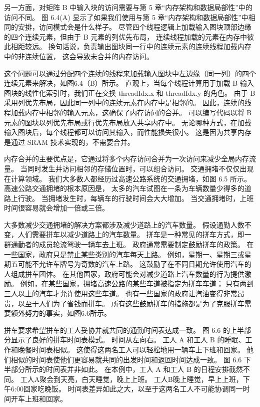 另一方面，对矩阵 B 中输入块的访问需要与第 5 章“内存架构和数据局部性”中的访问不同。 
图 6.4(A) 显示了如果我们使用与第 5 章“内存架构和数据局部性”中相同的安排，访问模式会是什么样子。 
尽管四个线程逻辑上加载输入图块顶部边缘的四个连续元素，但由于 B 元素的列优先布局，
连续线程加载的元素在内存中彼此相距较远。 换句话说，负责输出图块同一行中的连续元素的连续线程加载内存中的非连续位置，
这会导致未合并的内存访问。

这个问题可以通过分配四个连续的线程来加载输入图块中左边缘（同一列）的四个连续元素来解决，如图6.4（B）所示。 
直观上，当每个线程计算用于加载 B 输入图块的线性化索引时，我们正在交换 threadIdx.x 和 threadIdx.y 的角色。 
由于 B 采用列优先布局，因此同一列中的连续元素在内存中是相邻的。 
因此，连续的线程加载内存中相邻的输入元素，这确保了内存访问的合并。 
可以编写代码以将 B 元素的图块以列优先布局或行优先布局放入共享内存中。 
无论哪种方式，在加载输入图块后，每个线程都可以访问其输入，而性能损失很小。 
这是因为共享内存是通过 SRAM 技术实现的，不需要合并。

内存合并的主要优点是，它通过将多个内存访问合并为一次访问来减少全局内存流量。 
当同时发生并访问相邻的存储位置时，可以组合访问。 交通拥堵不仅仅出现在计算领域。 
我们大多数人都经历过高速公路系统的交通拥堵，如图 6.5 所示。 高速公路交通拥堵的根本原因是，
太多的汽车试图在一条为车辆数量少得多的道路上行驶。 当拥堵发生时，每辆车的行驶时间会大大增加。 
当交通拥堵时，上班时间很容易就会增加一倍或三倍。

大多数减少交通拥堵的解决方案都涉及减少道路上的汽车数量。 假设通勤人数不变，人们需要拼车以减少道路上的汽车数量。 
拼车是一种常见的拼车方式，即一群通勤者的成员轮流驾驶一辆车去上班。 政府通常需要制定鼓励拼车的政策。 
在一些国家，政府只是禁止某些类别的汽车每天上路。 例如，星期一、星期三或星期五可能不允许车牌号为奇数的汽车上路。 
这鼓励了在不同日期允许使用汽车的人组成拼车团体。 在其他国家，政府可能会对减少道路上汽车数量的行为提供激励。 
例如，在某些国家，拥堵高速公路的某些车道被指定为拼车车道； 只有两到三人以上的汽车才允许使用这些车道。 
也有一些国家的政府让汽油变得非常昂贵，以至于人们为了省钱而拼车。 
所有这些鼓励拼车的措施都是为了克服拼车需要额外努力的事实，如图6.6所示。

拼车要求希望拼车的工人妥协并就共同的通勤时间表达成一致。 图 6.6 的上半部分显示了良好的拼车时间表模式。 
时间从左向右。 工人 A 和工人 B 的睡眠、工作和晚餐时间表相似。 这使得这两名工人可以轻松地用一辆车上下班和回家。 
他们相似的时间表使他们更容易就共同的出发时间和返回时间达成一致。 图 6.6 下半部分所示的时间表并非如此。 
在本例中，工人 A 和工人 B 的日程安排截然不同。 工人A聚会到天亮，白天睡觉，晚上上班。 
工人B晚上睡觉，早上上班，下午6:00回家吃晚饭。 时间表差异如此之大，以至于这两名工人不可能协调同一时间开车上班和回家。

